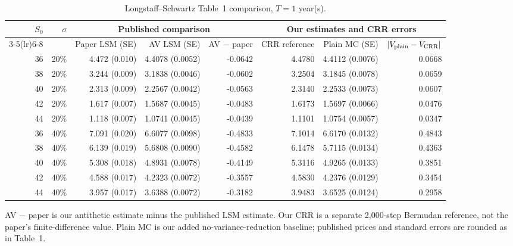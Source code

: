 \begin{table}[!htbp]
    \centering\scriptsize
    \caption{Longstaff--Schwartz Table~1 comparison, \(T=1\) year(s).}
    \label{tab:lsm_paper_comparison_t1}
    \setlength{\tabcolsep}{3pt}
    \begin{tabular*}{\linewidth}{@{\extracolsep{\fill}}rr|rrrrrr}
        \toprule
        \(S_0\) & \(\sigma\) & \multicolumn{3}{c|}{Published comparison} & \multicolumn{3}{c}{Our estimates and CRR errors} \\
        \cmidrule(lr){3-5}\cmidrule(lr){6-8}
        & & Paper LSM (SE) & AV LSM (SE) & AV $-$ paper & CRR reference & Plain MC (SE) & \(|V_{\rm plain}-V_{\rm CRR}|\) \\
        \midrule
        36 & 20\% & 4.472 (0.010) & 4.4078 (0.0052) & -0.0642 & 4.4780 & 4.4112 (0.0076) & 0.0668 \\
        38 & 20\% & 3.244 (0.009) & 3.1838 (0.0046) & -0.0602 & 3.2504 & 3.1845 (0.0078) & 0.0659 \\
        40 & 20\% & 2.313 (0.009) & 2.2567 (0.0042) & -0.0563 & 2.3140 & 2.2533 (0.0073) & 0.0607 \\
        42 & 20\% & 1.617 (0.007) & 1.5687 (0.0045) & -0.0483 & 1.6173 & 1.5697 (0.0066) & 0.0476 \\
        44 & 20\% & 1.118 (0.007) & 1.0741 (0.0045) & -0.0439 & 1.1101 & 1.0754 (0.0057) & 0.0347 \\
        36 & 40\% & 7.091 (0.020) & 6.6077 (0.0098) & -0.4833 & 7.1014 & 6.6170 (0.0132) & 0.4843 \\
        38 & 40\% & 6.139 (0.019) & 5.6808 (0.0090) & -0.4582 & 6.1478 & 5.7115 (0.0134) & 0.4363 \\
        40 & 40\% & 5.308 (0.018) & 4.8931 (0.0078) & -0.4149 & 5.3116 & 4.9265 (0.0133) & 0.3851 \\
        42 & 40\% & 4.588 (0.017) & 4.2323 (0.0072) & -0.3557 & 4.5830 & 4.2376 (0.0129) & 0.3454 \\
        44 & 40\% & 3.957 (0.017) & 3.6388 (0.0072) & -0.3182 & 3.9483 & 3.6525 (0.0124) & 0.2958 \\
        \bottomrule
    \end{tabular*}
    \begin{minipage}{0.96\linewidth}\footnotesize
    AV $-$ paper is our antithetic estimate minus the published LSM estimate. Our CRR is a separate 2,000-step Bermudan reference, not the paper's finite-difference value.
    Plain MC is our added no-variance-reduction baseline; published prices and standard errors are rounded as in Table~1.
    \end{minipage}
\end{table}


